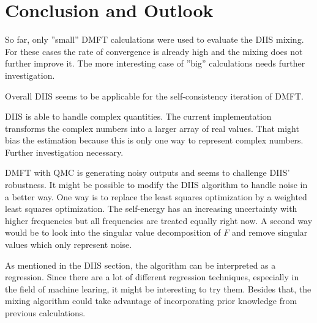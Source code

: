 \chapter{Conclusion and Outlook}
\label{ch:conclusion_outlook}
So far, only ''small'' DMFT calculations were used to evaluate the DIIS mixing. For these cases the rate of convergence is already high and the mixing does not further improve it. The more interesting case of ''big'' calculations needs further investigation.

Overall DIIS seems to be applicable for the self-consistency iteration of DMFT.

DIIS is able to handle complex quantities. The current implementation transforms the complex numbers into a larger array of real values. That might bias the estimation because this is only one way to represent complex numbers. Further investigation necessary.

DMFT with QMC is generating noisy outputs and seems to challenge DIIS' robustness. It might be possible to modify the DIIS algorithm to handle noise in a better way. One way is to replace the least squares optimization by a weighted least squares optimization. The self-energy has an increasing uncertainty with higher frequencies but all frequencies are treated equally right now. A second way would be to look into the singular value decomposition of $F$ and remove singular values which only represent noise.

As mentioned in the DIIS section, the algorithm can be interpreted as a regression. Since there are a lot of different regression techniques, especially in the field of machine learing, it might be interesting to try them. Besides that, the mixing algorithm could take advantage of incorporating prior knowledge from previous calculations.

